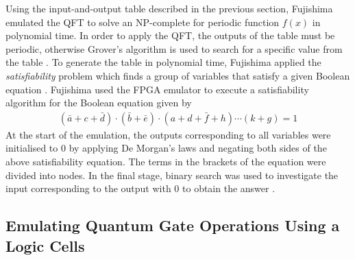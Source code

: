 Using the input-and-output table described in the previous section, Fujishima emulated the QFT to solve an NP-complete for periodic function $f(x)$ in polynomial time. In order to apply the QFT, the outputs of the table must be periodic, otherwise Grover's algorithm is used to search for a specific value from the table \cite{fujishima2003fpga}. To generate the table in polynomial time, Fujishima applied the \textit{satisfiability} problem which finds a group of variables that satisfy a given Boolean equation \cite{fujishima2003fpga}. Fujishima used the FPGA emulator to execute a satisfiability algorithm for the Boolean equation given by
\begin{align}
	(\bar{a}+c+\bar{d})\cdot(\bar{b}+\bar{e})\cdot(a+d+\bar{f}+h)\cdots(k+g)=1\nonumber
\end{align}
At the start of the emulation, the outputs corresponding to all variables were initialised to 0 by applying De Morgan's laws and negating both sides of the above satisfiability equation. The terms in the brackets of the equation were divided into nodes. In the final stage, binary search was used to investigate the input corresponding to the output with 0 to obtain the answer \cite{fujishima2003fpga}. 

\subsection{Emulating Quantum Gate Operations Using a Logic Cells}

